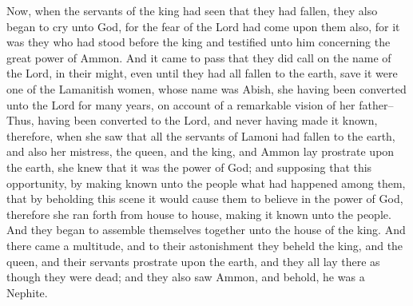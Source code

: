 Now, when the servants of the king had seen that they had fallen, they also began to cry unto God, for the fear of the Lord had come upon them also, for it was they who had stood before the king and testified unto him concerning the great power of Ammon.
\bverse \iffalse And it came to pass that they did call on the name of the Lord, in their might, even until they had all fallen to the earth, save it were one of the Lamanitish women, whose name was Abish, she having been converted unto the Lord for many years, on account of a remarkable vision of her father-- \fi
And it came to pass that they did call on the name of the Lord, in their might, even until they had all fallen to the earth, save it were one of the Lamanitish women, whose name was Abish, she having been converted unto the Lord for many years, on account of a remarkable vision of her father--
\bverse \iffalse Thus, having been converted to the Lord, and never having made it known, therefore, when she saw that all the servants of Lamoni had fallen to the earth, and also her mistress, the queen, and the king, and Ammon lay prostrate upon the earth, she knew that it was the power of God; and supposing that this opportunity, by making known unto the people what had happened among them, that by beholding this scene it would cause them to believe in the power of God, therefore she ran forth from house to house, making it known unto the people. \fi
Thus, having been converted to the Lord, and never having made it known, therefore, when she saw that all the servants of Lamoni had fallen to the earth, and also her mistress, the queen, and the king, and Ammon lay prostrate upon the earth, she knew that it was the power of God; and supposing that this opportunity, by making known unto the people what had happened among them, that by beholding this scene it would cause them to believe in the power of God, therefore she ran forth from house to house, making it known unto the people.
\bverse \iffalse And they began to assemble themselves together unto the house of the king. And there came a multitude, and to their astonishment they beheld the king, and the queen, and their servants prostrate upon the earth, and they all lay there as though they were dead; and they also saw Ammon, and behold, he was a Nephite. \fi
And they began to assemble themselves together unto the house of the king. And there came a multitude, and to their astonishment they beheld the king, and the queen, and their servants prostrate upon the earth, and they all lay there as though they were dead; and they also saw Ammon, and behold, he was a Nephite.
